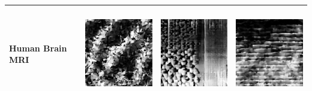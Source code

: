 \begin{table}[H]
\begin{tabularx}{\linewidth}{@{}>{\centering\arraybackslash}m{3cm}>{\centering\arraybackslash}X>{\centering\arraybackslash}X>{\centering\arraybackslash}X@{}}
Human Brain MRI & \includegraphics[valign=M,width=\linewidth,height=4cm,keepaspectratio]{main/content/images/sd_hyperdreambooth/brain_tumor/glioma1.jpeg} & \includegraphics[valign=M,width=\linewidth,height=4cm,keepaspectratio]{main/content/images/sd_hyperdreambooth/brain_tumor/glioma2.jpeg} & \includegraphics[valign=M,width=\linewidth,height=4cm,keepaspectratio]{main/content/images/sd_hyperdreambooth/brain_tumor/glioma3.jpeg} \\
\midrule

\end{tabularx}
\end{table}
